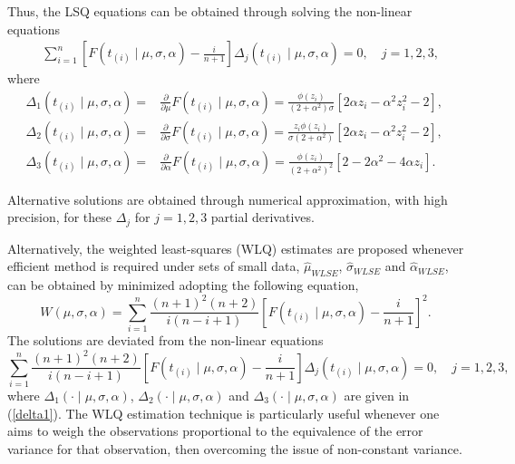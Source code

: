 \documentclass[]{interact}
\theoremstyle{plain}%
\theoremstyle{definition}
\theoremstyle{remark}
\begin{document}
Thus, the LSQ equations can be obtained through solving the non-linear equations
\begin{equation*}
\begin{aligned}
&\sum_{i=1}^{n}\left[ F\left( t_{(i)}\mid \mu,\sigma,\alpha \right) - \frac {i}{n+1}\right] \Delta_{j}\left( t_{(i)} \mid \mu,\sigma,\alpha \right) = 0, \quad  j=1,2,3 ,
\end{aligned}
\end{equation*}
where
\begin{equation}\label{delta1}
\begin{aligned}
\Delta_{1}\left( t_{(i)}\mid \mu,\sigma,\alpha \right) = &\frac{\partial}{\partial \mu} F\left( t_{(i)}\mid \mu,\sigma,\alpha \right) = \frac{\phi\left(z_i\right)}{(2+\alpha^2)\sigma}[2\alpha z_i - \alpha ^2 z_i^2 -2], \, \\
\Delta_{2}\left( t_{(i)}\mid \mu,\sigma,\alpha \right) = &\frac{\partial}{\partial \sigma} F\left( t_{(i)}\mid \mu,\sigma,\alpha \right)=\frac{z_i \phi\left(z_i\right)}{\sigma(2+\alpha^2)}[2\alpha z_i-\alpha^2 z_i^2 - 2], \\ 
\Delta_{3}\left( t_{(i)}\mid \mu,\sigma,\alpha \right) = &\frac{\partial}{\partial \alpha} F\left( t_{(i)}\mid \mu,\sigma,\alpha \right) = \frac{\phi\left(z_i\right)}{(2+\alpha^2)^2} [2-2\alpha^2 -4\alpha z_i].
\end{aligned}
\end{equation}%


Alternative solutions are obtained through numerical approximation, with high precision, for these $\Delta_{j}$ for $j=1,2,3$ partial derivatives.

Alternatively, the weighted least-squares (WLQ) estimates are proposed whenever efficient method is required under sets of small data, $\hat{\mu}_{WLSE}$, $\hat{\sigma}_{WLSE}$ and $\hat{\alpha}_{WLSE}$, can be obtained by minimized adopting the following equation,
\begin{equation*}
W\left( \mu,\sigma,\alpha \right) = \sum_{i=1}^{n}
\frac {\left( n+1\right)^{2}\left( n+2\right)}{i\left( n-i+1\right)}
\left[ F\left( t_{(i)}\mid \mu,\sigma,\alpha \right) - \frac {i}{n+1} \right]^{2}.
\end{equation*}
The solutions are deviated from the non-linear equations
\begin{equation*}
\sum_{i=1}^{n}\frac {\left( n+1\right)^{2}\left( n+2\right)}{i\left( n-i+1\right)}
\left[ F\left( t_{(i)}\mid \mu,\sigma,\alpha \right) -
\frac {i}{n+1} \right] \Delta_{j}\left( t_{(i)}\mid \mu,\sigma,\alpha\right) = 0, \quad j=1,2,3,
\end{equation*}
where $\Delta _{1}\left( \cdot \mid \mu,\sigma,\alpha \right)$, $\Delta _{2}\left( \cdot \mid \mu,\sigma,\alpha \right) $ and
$\Delta
_{3}\left( \cdot \mid \mu,\sigma,\alpha \right) $ are given in (\ref{delta1}). The WLQ estimation technique is particularly useful whenever one aims to weigh the observations proportional to the equivalence of the error variance for that observation, then overcoming the issue of non-constant variance.
\end{document}
